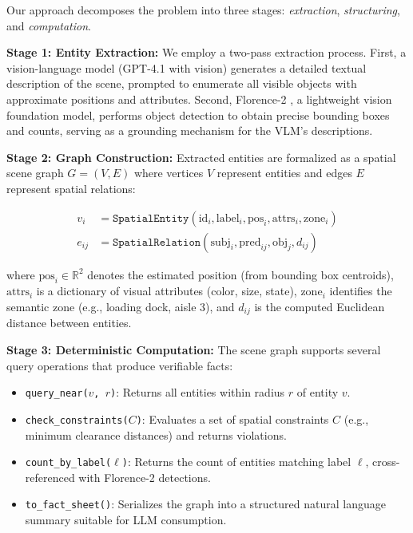 \documentclass{article}
\begin{document}
Our approach decomposes the problem into three stages: \emph{extraction}, \emph{structuring}, and \emph{computation}.
\smallskip

\textbf{Stage 1: Entity Extraction:}
We employ a two-pass extraction process. First, a vision-language model (GPT-4.1 with vision) generates a detailed textual description of the scene, prompted to enumerate all visible objects with approximate positions and attributes. Second, Florence-2 \citep{xiao2024florence2}, a lightweight vision foundation model, performs object detection to obtain precise bounding boxes and counts, serving as a grounding mechanism for the VLM's descriptions.
\smallskip

\textbf{Stage 2: Graph Construction:}
Extracted entities are formalized as a spatial scene graph $G = (V, E)$ where vertices $V$ represent entities and edges $E$ represent spatial relations:

\begin{align}
  v_i &= \texttt{SpatialEntity}(\text{id}_i, \text{label}_i, \text{pos}_i, \text{attrs}_i, \text{zone}_i) \label{eq:entity} \\
  e_{ij} &= \texttt{SpatialRelation}(\text{subj}_i, \text{pred}_{ij}, \text{obj}_j, d_{ij}) \label{eq:relation}
\end{align}

where $\text{pos}_i \in \mathbb{R}^2$ denotes the estimated position (from bounding box centroids), $\text{attrs}_i$ is a dictionary of visual attributes (color, size, state), $\text{zone}_i$ identifies the semantic zone (e.g., loading dock, aisle 3), and $d_{ij}$ is the computed Euclidean distance between entities.
\smallskip

\textbf{Stage 3: Deterministic Computation:}
The scene graph supports several query operations that produce verifiable facts:

\begin{itemize}[leftmargin=*,nosep]
  \item \texttt{query\_near($v$, $r$)}: Returns all entities within radius $r$ of entity $v$.
  \item \texttt{check\_constraints($C$)}: Evaluates a set of spatial constraints $C$ (e.g., minimum clearance distances) and returns violations.
  \item \texttt{count\_by\_label($\ell$)}: Returns the count of entities matching label $\ell$, cross-referenced with Florence-2 detections.
  \item \texttt{to\_fact\_sheet()}: Serializes the graph into a structured natural language summary suitable for LLM consumption.
\end{itemize}
\end{document}
